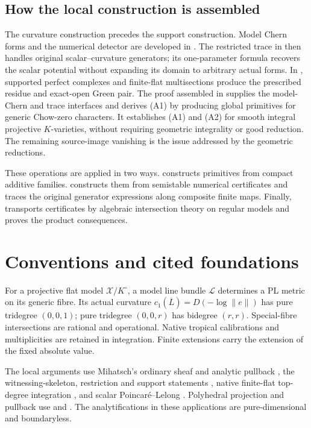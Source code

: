 \documentclass[11pt]{article}
\theoremstyle{definition}
\theoremstyle{remark}
\numberwithin{equation}{section}
\begin{document}
\subsection{How the local construction is assembled}\label{sec:construction-strategy}

The curvature construction precedes the support construction. Model Chern forms and the numerical detector are developed in . The restricted trace in  then handles original scalar--curvature generators; its one-parameter formula recovers the scalar potential without expanding its domain to arbitrary actual forms. In , supported perfect complexes and finite-flat multisections produce the prescribed residue and exact-open Green pair. The proof assembled in \cite[Theorem 1.1]{ChowGreenPairs} supplies the model-Chern and trace interfaces and derives (A1) by producing global primitives for generic Chow-zero characters. It establishes (A1) and (A2) for smooth integral projective $K$-varieties, without requiring geometric integrality or good reduction. The remaining source-image vanishing is the issue addressed by the geometric reductions.

These operations are applied in two ways.  constructs primitives from compact additive families.  constructs them from semistable numerical certificates and traces the original generator expressions along composite finite maps. Finally,  transports certificates by algebraic intersection theory on regular models and proves the product consequences.

\section{Conventions and cited foundations}\label{sec:foundations}

For a projective flat model $\mathcal X/K^\circ$, a model line bundle $\mathcal L$ determines a PL metric on its generic fibre. Its actual curvature $c_1(\overline L)=D(-\log\|e\|)$ has pure tridegree $(0,0,1)$; pure tridegree $(0,0,r)$ has bidegree $(r,r)$. Special-fibre intersections are rational and operational. Native tropical calibrations and multiplicities are retained in integration. Finite extensions carry the extension of the fixed absolute value.

The local arguments use Mihatsch's ordinary sheaf and analytic pullback \cite[Definition 4.2 and Theorem 4.5]{M}, the witnessing-skeleton, restriction and support statements \cite[Lemma 4.4, Corollary 4.9 and Proposition 4.11]{M}, native finite-flat top-degree integration \cite[Lemma 3.15 and Definition 4.10]{M}, and scalar Poincar\'e--Lelong \cite[Theorem 5.5 and Corollary 5.6]{M}. Polyhedral projection and pullback use \cite[Section 2 and Proposition/Definition 4.2]{MTrop} and \cite[Proposition 2.38 and Definition 2.41]{M}. The analytifications in these applications are pure-dimensional and boundaryless.
\end{document}
